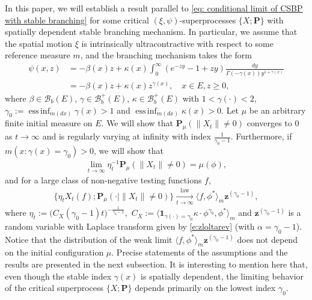 \documentclass[12pt,a4paper]{amsart}
\theoremstyle{definition}
\numberwithin{equation}{section}
\begin{document}
In this paper, we will establish a result parallel to \eqref{eq: conditional limit of CSBP with stable branching} for some critical $(\xi,\psi)$-superprocesses $\{X; \mathbf P\}$ with spatially dependent stable branching mechanism.
In particular, we assume that the spatial motion $\xi$ is intrinsically ultracontractive with respect to some reference measure $m$, and the branching mechanism takes the form
\begin{align}
	\psi(x,z)
  &= - \beta(x) z + \kappa(x) \int_0^\infty (e^{-z y} - 1+ z y) \frac{dy}{\Gamma(- \gamma(x)) y^{1+ \gamma(x)}}
  \\&=  -\beta (x) z + \kappa(x) z^{\gamma(x)},
	\quad x\in E, z \geq 0,
\end{align}
where $\beta \in \mathscr B_b(E)$, $\gamma \in \mathscr B^+_b(E)$, $\kappa \in \mathscr B^+_b(E)$ with $1< \gamma(\cdot )<2$, $\gamma_0 := \operatorname{ess\,inf}_{m(dx)} \gamma(x)> 1$ and $\operatorname{ess\,inf}_{m(dx)}\kappa(x) > 0$.
Let $\mu$ be an arbitrary finite initial measure on $E$.
We will show that $\mathbf P_{\mu}( \| X_t\| \neq 0)$ converges to $0$ as $t\to \infty$ and is regularly varying at infinity with index $\frac{1}{\gamma_0 - 1}$.
Furthermore, if $m(x: \gamma(x) = \gamma_0)>0$, we will show that
\begin{align}
	\lim_{t\to \infty}\eta^{-1}_t \mathbf P_{\mu}( \|X_t\| \neq0)
	= \mu(\phi),
\end{align}
and for a large class of non-negative testing functions $f$,
\begin{align}\label{eq: result2}
	\{ \eta_t X_t(f) ; \mathbf P_{\mu}(\cdot | \|X_t\|\neq 0) \}
	\xrightarrow[t\to \infty]{\operatorname{law}}
	\langle f, \phi^*\rangle_m \mathbf z^{(\gamma_0 - 1)},
\end{align}
where $\eta_t := \big( C_X(\gamma_0 - 1) t \big)^{- \frac {1} {\gamma_0 - 1} },$ $C_X := \langle \mathbf 1_{\gamma(\cdot) = \gamma_0} \kappa\cdot \phi^{\gamma_0}, \phi^* \rangle_m$ and $\mathbf z^{(\gamma_0 - 1)}$ is a random variable with Laplace transform given by \eqref{e:zloltarev} (with $\alpha=\gamma_0-1$).
Notice that the distribution of the weak limit $\langle f, \phi^*\rangle_m \mathbf z^{(\gamma_0 - 1)}$
does not depend on the initial configuration $\mu$.
Precise statements of the assumptions and the results are presented in the next subsection.
It is interesting to mention here that, even though the stable index $\gamma(x)$ is spatially dependent, the limiting behavior of the critical superprocess $\{X; \mathbf P\}$ depends primarily on the lowest index $\gamma_0$.
\end{document}
